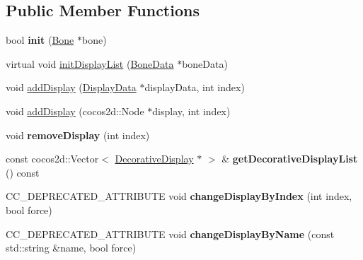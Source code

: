 \subsection*{Public Member Functions}
\begin{DoxyCompactItemize}
\item 
\mbox{\label{classcocostudio_1_1DisplayManager_ac5591fb1eda52851b9bb56fed2dde96b}} 
bool {\bfseries init} (\hyperlink{classcocostudio_1_1Bone}{Bone} $\ast$bone)
\item 
virtual void \hyperlink{classcocostudio_1_1DisplayManager_a52d5c8095ef494190837cd9f7a3600ae}{init\+Display\+List} (\hyperlink{classcocostudio_1_1BoneData}{Bone\+Data} $\ast$bone\+Data)
\item 
void \hyperlink{classcocostudio_1_1DisplayManager_a8e9ebcae212efcdebc814dc4010b4fc8}{add\+Display} (\hyperlink{classcocostudio_1_1DisplayData}{Display\+Data} $\ast$display\+Data, int index)
\item 
void \hyperlink{classcocostudio_1_1DisplayManager_a2af09bbaa5e3257f00454a024192539c}{add\+Display} (cocos2d\+::\+Node $\ast$display, int index)
\item 
\mbox{\label{classcocostudio_1_1DisplayManager_a1cbf5ea934a66829aceb5d3d48899786}} 
void {\bfseries remove\+Display} (int index)
\item 
\mbox{\label{classcocostudio_1_1DisplayManager_a5eff419244cbbba761c50845f4089856}} 
const cocos2d\+::\+Vector$<$ \hyperlink{classcocostudio_1_1DecorativeDisplay}{Decorative\+Display} $\ast$ $>$ \& {\bfseries get\+Decorative\+Display\+List} () const
\item 
\mbox{\label{classcocostudio_1_1DisplayManager_a4a36d9fee14cae46726470ba18132a48}} 
C\+C\+\_\+\+D\+E\+P\+R\+E\+C\+A\+T\+E\+D\+\_\+\+A\+T\+T\+R\+I\+B\+U\+TE void {\bfseries change\+Display\+By\+Index} (int index, bool force)
\item 
\mbox{\label{classcocostudio_1_1DisplayManager_a06dc3789c6e53d710db3fec45edbac27}} 
C\+C\+\_\+\+D\+E\+P\+R\+E\+C\+A\+T\+E\+D\+\_\+\+A\+T\+T\+R\+I\+B\+U\+TE void {\bfseries change\+Display\+By\+Name} (const std\+::string \&name, bool force)
\item 

\end{DoxyCompactItemize}
